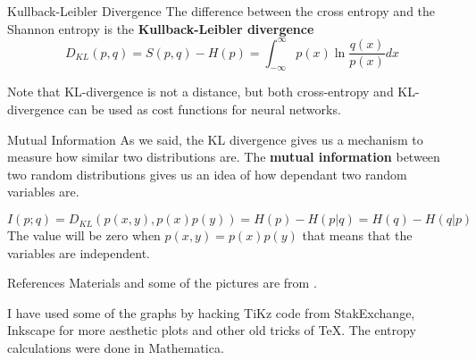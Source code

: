\documentclass{beamer}
\begin{document}
\begin{frame}{Kullback-Leibler Divergence}
	The difference between the cross entropy and the Shannon entropy is the \textbf{Kullback-Leibler divergence}
	\begin{equation*}
		D_{KL}(p,q)= S(p,q)- H(p)= \int_{-\infty}^{\infty} p(x) \ln \frac{q(x)}{p(x)} dx
	\end{equation*}

	Note that KL-divergence is not a distance, but both cross-entropy and KL-divergence can be used as cost functions for neural networks.
\end{frame}

\begin{frame}{Mutual Information}
As we said, the KL divergence gives us a mechanism to measure how similar two distributions are. The \textbf{mutual information} between two random distributions gives us an idea of how dependant two random variables are.


\begin{equation*}
I(p;q)= D_{KL}(p(x,y),p(x)p(y))=H(p)-H(p|q)=H(q)-H(q|p)
\end{equation*}
The value will be zero when $p(x,y)=p(x)p(y)$ that means that the variables are independent.
\end{frame}

\begin{frame}{References}
	Materials and some of the pictures are from \citep{calin}.
	\printbibliography 	
	
	I have used some of the graphs by hacking TiKz code from StakExchange, Inkscape for more aesthetic plots and other old tricks of \TeX. The entropy calculations were done in Mathematica.
	
\end{frame}
\end{document}
